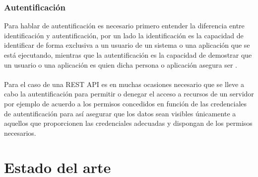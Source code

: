 \subsubsection{Autentificación}
Para hablar de autentificación es necesario primero entender la diferencia entre identificación y autentificación, por un lado la identificación es la capacidad de identificar de forma exclusiva a un usuario de un sistema o una aplicación que se está ejecutando, mientras que la autentificación es la capacidad de demostrar que un usuario o una aplicación es quien dicha persona o aplicación asegura ser \cite{authent}.\\\\
Para el caso de una REST API es en muchas ocasiones necesario que se lleve a cabo la autentificación para permitir o denegar el acceso a recursos de un servidor por ejemplo de acuerdo a los permisos concedidos en función de las credenciales de autentificación para así asegurar que los datos sean visibles únicamente a aquellos que proporcionen las credenciales adecuadas y dispongan de los permisos necesarios.




\section{Estado del arte}

